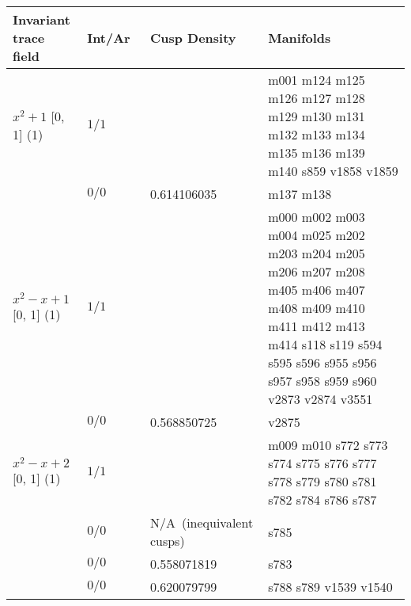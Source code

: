 \documentclass[a4paper]{amsart}
\newcommand{\PreserveBackslash}[1]{\let\temp =\\#1\let\\=\temp}
\theoremstyle{definition}
\begin{document}
\begin{table}[p] 
\centering  
\begin{tabular}{|>{\PreserveBackslash\raggedright}p{3.5cm} |l %
	|l %
	|>{\PreserveBackslash\raggedright}p{5cm}|}

\hline

Invariant trace field &  Int/Ar\ & Cusp Density & Manifolds \\

\hline

\hbox{$x^2 + 1$} [0, 1] (1) &
$1/1$ &
~~&
{m001 m124 m125 m126 m127 m128 m129 m130 m131 m132 m133 m134 m135 m136 m139 m140 
	s859 v1858 v1859} \\

\cline{2-4}

& %
$0/0$ &
 0.614106035 &
 {m137 m138} \\

\hline


\hbox{$x^2 - x + 1$} [0, 1] (1) &
$1/1$ &
~~&
{m000 m002 m003 m004 m025 m202 m203 m204 m205 m206 m207 m208 m405 m406  
m407 m408 m409 m410 m411  m412 m413 m414  s118 s119 s594 s595 s596
 s955 s956 s957 s958 s959 s960  v2873 v2874 v3551} \\

\cline{2-4}

& %
$0/0$ &
 0.568850725 &
{v2875} \\

\hline


\hbox{$x^2 - x + 2$} [0, 1] (1) &
$1/1$ &
~~&
{m009 m010 s772 s773  s774 s775 s776 s777 s778 s779 s780 s781 s782 s784
 s786 s787} \\

\cline{2-4}

& %
$0/0$ &
 N/A~(inequivalent cusps)&   %
{s785} \\

\cline{2-4}

& %
$0/0$ &
 0.558071819&
{s783} \\

\cline{2-4}

& %
$0/0$ &
 0.620079799 &
{s788 s789 v1539 v1540} \\


\end{tabular}
\end{table}
\end{document}
